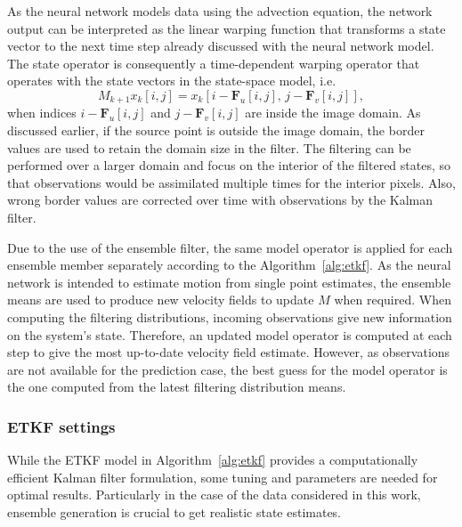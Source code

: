 As the neural network models data using the advection equation, the network output can be interpreted as the linear warping function that transforms a state vector to the next time step already discussed with the neural network model.
The state operator is consequently a time-dependent warping operator that operates with the state vectors in the state-space model, i.e.
\begin{equation*}
    M_{k+1}x_k[i,j] = 
        x_{k}[i-\mathbf{F}_{u}[i,j], \, j - \mathbf{F}_{v}[i,j]],
\end{equation*}
when indices $i-\mathbf{F}_{u}[i,j]$ and $j - \mathbf{F}_{v}[i,j]$ are inside the image domain.
As discussed earlier, if the source point is outside the image domain, the border values are used to retain the domain size in the filter.
The filtering can be performed over a larger domain and focus on the interior of the filtered states, so that observations would be assimilated multiple times for the interior pixels.
Also, wrong border values are corrected over time with observations by the Kalman filter.

Due to the use of the ensemble filter, the same model operator is applied for each ensemble member separately according to the Algorithm~\ref{alg:etkf}.
As the neural network is intended to estimate motion from single point estimates, the ensemble means are used to produce new velocity fields to update $M$ when required.
When computing the filtering distributions, incoming observations give new information on the system's state.
Therefore, an updated model operator is computed at each step to give the most up-to-date velocity field estimate.
However, as observations are not available for the prediction case, the best guess for the model operator is the one computed from the latest filtering distribution means.

\subsubsection{ETKF settings\label{subsubsec:etkftuning}}
While the ETKF model in Algorithm~\ref{alg:etkf} provides a computationally efficient Kalman filter formulation, some tuning and parameters are needed for optimal results.
Particularly in the case of the data considered in this work, ensemble generation is crucial to get realistic state estimates.

